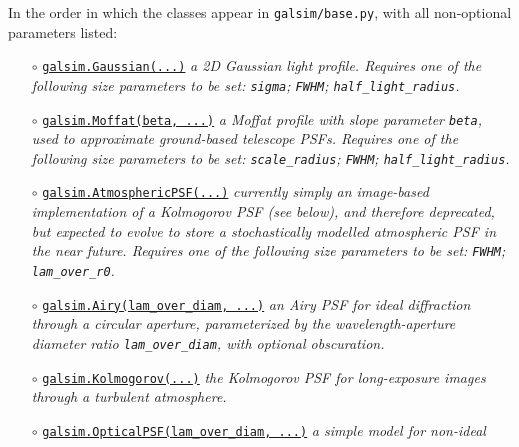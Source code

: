 \documentclass[preprint,11pt]{aastex}
\begin{document}
In the order in which
the classes appear in {\tt galsim/base.py}, with all non-optional
parameters listed:
\begin{itemize}
\item[$\circ$]
  \href{http://galsim-developers.github.com/GalSim/classgalsim_1_1base_1_1_gaussian.html}{\texttt{galsim.Gaussian(...)}}
  \newline \emph{a 2D Gaussian light profile. Requires one of the
    following size parameters to be set: \texttt{sigma}; \texttt{FWHM}; \texttt{half\_light\_radius}.}
\item[$\circ$]
  \href{http://galsim-developers.github.com/GalSim/classgalsim_1_1base_1_1_moffat.html}{\texttt{galsim.Moffat(beta,
    ...)}}
  \newline \emph{a Moffat profile with slope parameter \texttt{beta}, used to approximate ground-based
    telescope PSFs. Requires one of the
    following size parameters to be set: \texttt{scale\_radius}; \texttt{FWHM}; \texttt{half\_light\_radius}.}
\item[$\circ$]
  \href{http://galsim-developers.github.com/GalSim/classgalsim_1_1base_1_1_atmospheric_p_s_f.html}{\texttt{galsim.AtmosphericPSF(...)}}
  \newline \emph{currently simply an image-based
  implementation of a Kolmogorov PSF (see below), and therefore deprecated, but expected to evolve to
  store a stochastically modelled atmospheric PSF in the near future.
Requires one of the
    following size parameters to be set: \texttt{FWHM}; \texttt{lam\_over\_r0}.}
\item[$\circ$]
  \href{http://galsim-developers.github.com/GalSim/classgalsim_1_1base_1_1_airy.html}{\texttt{galsim.Airy(lam\_over\_diam,
      ...)}} \newline \emph{an Airy PSF for ideal diffraction
  through a circular aperture, parameterized by the wavelength-aperture
  diameter ratio \texttt{lam\_over\_diam}, with optional obscuration.}
\item[$\circ$] \href{http://galsim-developers.github.com/GalSim/classgalsim_1_1base_1_1_kolmogorov.html}{\texttt{galsim.Kolmogorov(...)}} \newline \emph{the Kolmogorov PSF for long-exposure
  images through a turbulent atmosphere.}
\item[$\circ$]
  \href{http://galsim-developers.github.com/GalSim/classgalsim_1_1base_1_1_optical_p_s_f.html}{\texttt{galsim.OpticalPSF(lam\_over\_diam,
      ...)}} \newline \emph{a simple model for non-ideal
}
\end{itemize}
\end{document}
